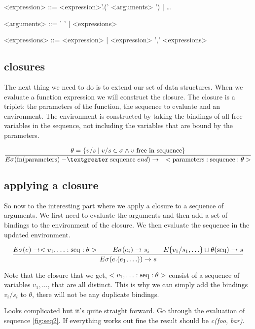 \documentclass[a4paper,11pt]{article}
\begin{document}
\begin{grammar}
<expression> ::=  <expression>'.(' <arguments> ') | \ldots 

<arguments> ::= '  ' | <expressions> 

<expressions> ::= <expression> | <expression> ',' <expressions>
\end{grammar}

\subsection{closures}

The next thing we need to do is to extend our set of data
structures. When we evaluate a function expression we will construct
the closure. The closure is a triplet: the parameters of the function,
the sequence to evaluate and an environment. The environment is
constructed by taking the bindings of all free variables in the
sequence, not including the variables that are bound by the
parameters.

$$\frac{ \theta = \{ v/s \mid  v/s \in \sigma \wedge v {\rm\ free\  in\ sequence}\}}{
E\sigma({\rm fn}({\rm parameters})\; {\rm -\textgreater}\; {\rm sequence}\; end )\rightarrow \quad <{\rm parameters}:{\rm sequence}:\theta>}$$

\subsection{applying a closure}

So now to the interesting part where we apply a closure to a sequence
of arguments. We first need to evaluate the arguments and then add a
set of bindings to the environment of the closure. We then evaluate
the sequence in the updated environment.

$$\frac{E\sigma(e) \rightarrow <v_1, \ldots:{\rm seq}:\theta > \qquad E\sigma(e_i) \rightarrow s_i \qquad E\{v_1/s_1, \ldots\}\cup\theta({\rm seq}) \rightarrow s}{
E\sigma(e.(e_1, \ldots)) \rightarrow s}$$ 

Note that the closure that we get, $<v_1, \ldots:{\rm seq}:\theta>$
consist of a sequence of variables $v_1, \ldots$, that are all
distinct. This is why we can simply add the bindings $v_i/s_i$ to
$\theta$, there will not be any duplicate bindings.

Looks complicated but it's quite straight forward. Go through the
evaluation of sequence \ref{fig:seq2}. If everything works out fine
the result should be {\em c(foo, bar)}.
\end{document}
